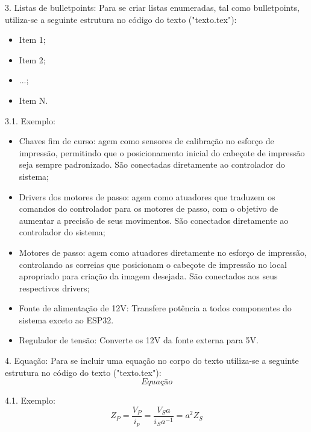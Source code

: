 3. Listas de bulletpoints:
Para se criar listas enumeradas, tal como bulletpoints, utiliza-se a seguinte estrutura no código do texto ("texto.tex"):
\begin{itemize}
    \item Item 1;
    \item Item 2;
    \item ...;
    \item Item N.
\end{itemize}

3.1. Exemplo:
\begin{itemize}
    \item Chaves fim de curso: agem como sensores de calibração no esforço de impressão, permitindo que o posicionamento inicial do cabeçote de impressão seja sempre padronizado. São conectadas diretamente ao controlador do sistema;
    \item Drivers dos motores de passo: agem como atuadores que traduzem os comandos do controlador para os motores de passo, com o objetivo de aumentar a precisão de seus movimentos. São conectados diretamente ao controlador do sistema;
    \item Motores de passo: agem como atuadores diretamente no esforço de impressão, controlando as correias que posicionam o cabeçote de impressão no local apropriado para criação da imagem desejada. São conectados aos seus respectivos drivers;
    \item Fonte de alimentação de 12V: Transfere potência a todos componentes do sistema exceto ao ESP32.
    \item Regulador de tensão: Converte os 12V da fonte externa para 5V.
\end{itemize}


4. Equação:
Para se incluir uma equação no corpo do texto utiliza-se a seguinte estrutura no código do texto ("texto.tex"):
\begin{equation}
Equação
\end{equation}

4.1. Exemplo:
\begin{equation}
Z_P = \frac{V_P}{i_p} = \frac{V_S a}{i_S a^{-1}} = a^{2}Z_S
\end{equation}

